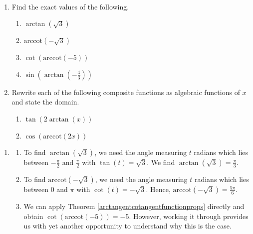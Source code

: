 \documentclass{ximera}
\begin{document}
\begin{example} \label{arctanarccotexample} $~$

\begin{enumerate}

\item  Find the exact values of the following.

\begin{enumerate}

\item $\arctan(\sqrt{3})$
\item  $\text{arccot}(-\sqrt{3})$
\item  $\cot(\text{arccot}(-5))$
\item  $\sin\left(\arctan\left(-\frac{4}{3}\right)\right)$
\end{enumerate}

\item  Rewrite each of the following composite functions as algebraic functions of $x$ and state the domain.

\begin{enumerate}

\item  $\tan(2 \arctan(x))$

\item  \label{cosineofarccotex} $\cos(\text{arccot}(2x))$ 

\end{enumerate}
\end{enumerate}

\begin{explanation}

\begin{enumerate}

\item

\begin{enumerate}

\item  To find $\arctan(\sqrt{3})$, we need the angle measuring $t$ radians which lies between $-\frac{\pi}{2}$ and $\frac{\pi}{2}$ with $\tan(t) = \sqrt{3}$.  We find  $\arctan(\sqrt{3}) = \frac{\pi}{3}$.

\item To find $\text{arccot}(-\sqrt{3})$, we need the angle measuring $t$ radians which lies between $0$ and $\pi$ with $\cot(t) = -\sqrt{3}$.  Hence, $\text{arccot}(-\sqrt{3}) = \frac{5\pi}{6}$.

\item  We can apply Theorem \ref{arctangentcotangentfunctionprops} directly and obtain $\cot(\text{arccot}(-5)) = -5$.  However, working it through provides us with yet another opportunity to understand why this is the case. 


\end{enumerate}
\end{enumerate}
\end{explanation}
\end{example}
\end{document}
